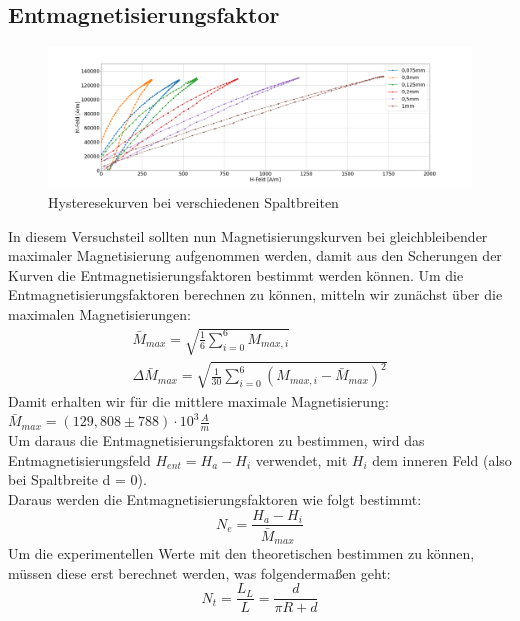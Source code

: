         \subsection{Entmagnetisierungsfaktor}
            \begin{figure}[H]
                \centering
                \includegraphics[width=0.8 \textwidth]{Images/Teil4.2.png}
                \caption{Hysteresekurven bei verschiedenen Spaltbreiten}
            \end{figure}
            In diesem Versuchsteil sollten nun Magnetisierungskurven bei gleichbleibender maximaler 
            Magnetisierung aufgenommen werden, damit aus den Scherungen der Kurven die Entmagnetisierungsfaktoren
            bestimmt werden können. Um die Entmagnetisierungsfaktoren berechnen zu können, mitteln wir zunächst 
            über die maximalen Magnetisierungen:
            \begin{align}
                \bar{M}_{max} = \sqrt{\frac{1}{6} \sum^6_{i=0} M_{max, i}}\\
                \Delta \bar{M}_{max} = \sqrt{\frac{1}{30} \sum^6_{i=0} (M_{max, i} - \bar{M}_{max})^2}
            \end{align}
            Damit erhalten wir für die mittlere maximale Magnetisierung: $\bar{M}_{max} = (129,808 \pm 788) \cdot 10^3 \frac{A}{m}$\\
            Um daraus die Entmagnetisierungsfaktoren zu bestimmen, wird das Entmagnetisierungsfeld $H_{ent} = H_a - H_i$ verwendet,
            mit $H_i$ dem inneren Feld (also bei Spaltbreite d = 0).\\
            Daraus werden die Entmagnetisierungsfaktoren wie folgt bestimmt:
            \begin{equation}
                N_e = \frac{H_a-H_i}{\bar{M}_{max}}
            \end{equation}
            Um die experimentellen Werte mit den theoretischen bestimmen zu können, müssen diese erst berechnet werden,
            was folgendermaßen geht:
            \begin{equation}
                N_t = \frac{L_L}{L} = \frac{d}{\pi R + d}
            \end{equation}
